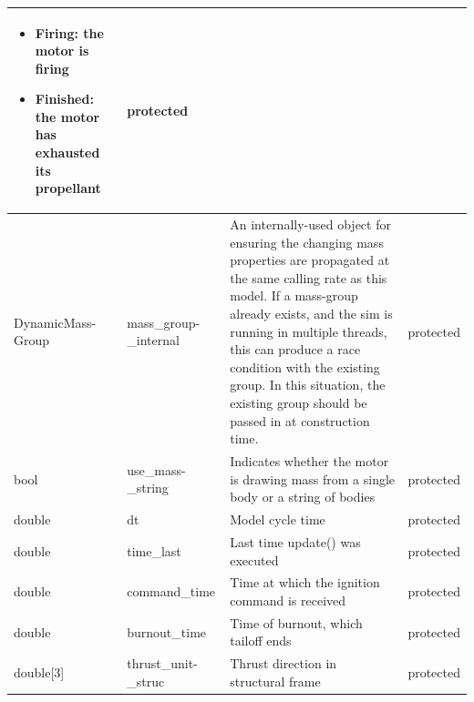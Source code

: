\documentclass[11pt,fleqn]{report}
\begin{document}
\begin{center}
\begin{longtable}{|p{2.75cm}|p{2.8cm}|p{7.1cm}|l|}
\begin{itemize}
\item \textbf{Firing}: the motor is firing
\item \textbf{Finished}: the motor has exhausted its propellant
\end{itemize}
& protected \\
\hline
DynamicMass-\newline Group & mass\_group-\newline \_internal & An internally-used object for ensuring the changing mass properties are propagated at the same calling rate as this model.  If a mass-group already exists, and the sim is running in multiple threads, this can produce a race condition with the existing group. In this situation, the existing group should be passed in at construction time. & protected \\
\hline
bool & use\_mass-\newline \_string & Indicates whether the motor is drawing mass from a single body or a string of bodies & protected \\
\hline
double & dt & Model cycle time & protected \\
\hline
double & time\_last & Last time update() was executed & protected \\
\hline
double & command\_time & Time at which the ignition command is received & protected \\
\hline
double & burnout\_time & Time of burnout, which tailoff ends & protected \\
\hline
double[3] & thrust\_unit-\newline \_struc & Thrust direction in structural frame & protected \\
\hline
\end{longtable}
\end{center}
\end{document}
